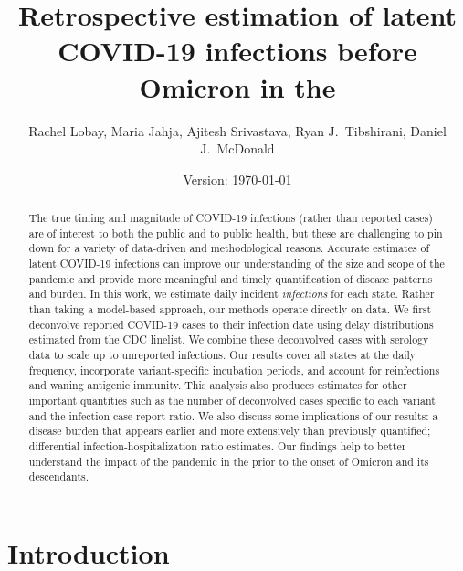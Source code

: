\documentclass{article}
\begin{document}
\title{Retrospective estimation of latent COVID-19 infections before Omicron in the \US}
\author{Rachel Lobay, Maria Jahja, Ajitesh Srivastava, Ryan J.\ Tibshirani, Daniel J.\ McDonald}
\date{Version: \today}
\maketitle

\begin{abstract}
The true timing and magnitude of COVID-19 infections (rather than reported
cases) are of interest to both the public and to public health, but these are
challenging to pin down for a variety of data-driven and methodological reasons.
Accurate estimates of latent COVID-19 infections can improve our understanding
of the size and scope of the pandemic and provide more meaningful and timely
quantification of disease patterns and burden. In this work, we estimate daily
incident \emph{infections} for each \US state. Rather than taking a model-based
approach, our methods operate directly on data. We first deconvolve reported
COVID-19 cases to their infection date using delay distributions estimated from
the CDC linelist. We combine these deconvolved cases with serology data to scale
up to unreported infections. Our results cover all states at the daily
frequency, incorporate variant-specific incubation periods, and account for
reinfections and waning antigenic immunity. This analysis also produces
estimates for other important quantities such as the number of deconvolved cases
specific to each variant and the infection-case-report ratio. We also discuss some
implications of our results: a disease burden that appears earlier and more
extensively than previously quantified; differential infection-hospitalization
ratio estimates. Our findings help to better understand the impact of the
pandemic in the \US prior to the onset of Omicron and its descendants. 

\end{abstract}

\section{Introduction}
\end{document}
